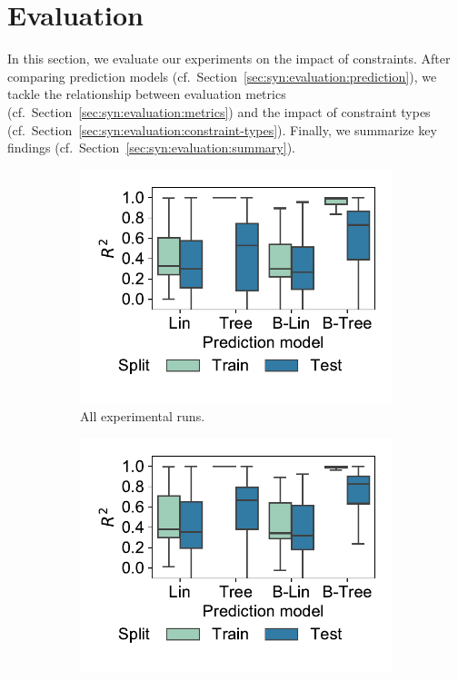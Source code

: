\section{Evaluation}
\label{sec:syn:evaluation}

In this section, we evaluate our experiments on the impact of constraints.
After comparing prediction models (cf.~Section~\ref{sec:syn:evaluation:prediction}), we tackle the relationship between evaluation metrics (cf.~Section~\ref{sec:syn:evaluation:metrics}) and the impact of constraint types (cf.~Section~\ref{sec:syn:evaluation:constraint-types}).
Finally, we summarize key findings (cf.~Section~\ref{sec:syn:evaluation:summary}).

\begin{figure}[t]
	\centering
	\begin{subfigure}{0.48\textwidth}
		\centering
		\includegraphics[width=\textwidth, trim=15 25 15 15, clip]{plots/syn-prediction-performance-all.pdf}
		\caption{All experimental runs.}
		\label{fig:syn:prediction-performance-all}
	\end{subfigure}
	\hfill
	\begin{subfigure}{0.48\textwidth}
		\centering
		\includegraphics[width=\textwidth, trim=15 25 15 15, clip]{plots/syn-prediction-performance-unconstrained.pdf}

\end{subfigure}
\end{figure}
